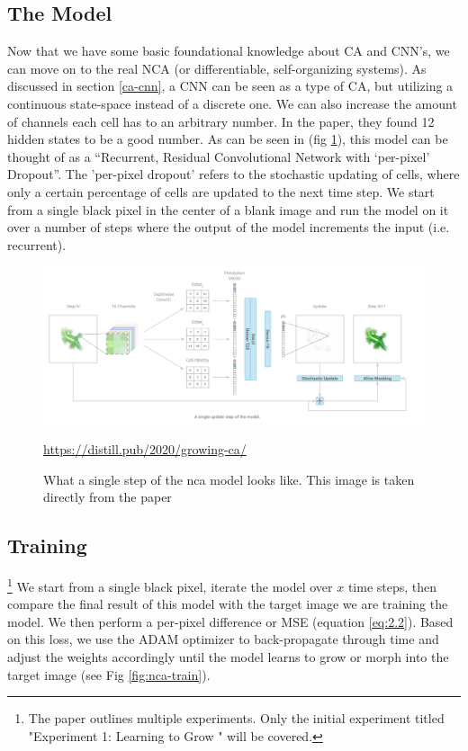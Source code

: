 \subsection{The Model}
Now that we have some basic foundational knowledge about CA and CNN's, we can move on to the real NCA (or differentiable, self-organizing systems). As discussed in section \ref{ca-cnn}, a CNN can be seen as a type of CA, but utilizing a continuous state-space instead of a discrete one. We can also increase the amount of channels each cell has to an arbitrary number. In the paper, they found 12 hidden states to be a good number. As can be seen in (fig \ref{fig:nca}), this model can be thought of as a “Recurrent, Residual Convolutional Network with ‘per-pixel’ Dropout”. The 'per-pixel dropout' refers to the stochastic updating of cells, where only a certain percentage of cells are updated to the next time step. We start from a single black pixel in the center of a blank image and run the model on it over a number of steps where the output of the model increments the input (i.e. recurrent).
\begin{figure}[h]
	\includegraphics[width=1\textwidth]{../Figures/growing_nca.png}
	\centering
	\caption[NCA]{What a single step of the nca model looks like. This image is taken directly from the  paper \cite{growing_nca}} 
	\label{fig:nca}
	\url{https://distill.pub/2020/growing-ca/}
\end{figure}

\subsection{Training} \footnote{The paper outlines multiple experiments. Only the initial experiment titled "Experiment 1: Learning to Grow " will be covered.}
We start from a single black pixel, iterate the model over $x$ time steps, then compare the final result of this model with the target image we are training the model. We then perform a per-pixel difference or MSE (equation \ref{eq:2.2}). Based on this loss, we use the ADAM optimizer to back-propagate through time and adjust the weights accordingly until the model learns to grow or morph into the target image (see Fig \ref{fig:nca-train}).
	
